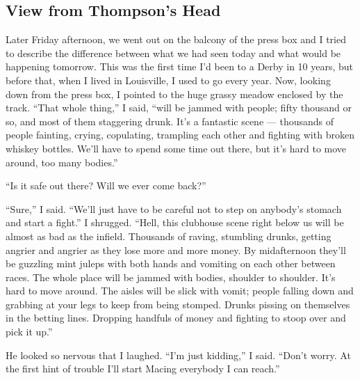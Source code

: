 \documentclass[9pt,a4paper]{extarticle}
\begin{document}

\subsection{View from Thompson’s Head}
Later Friday afternoon, we went out on the balcony of the press box and I tried to describe the difference between what we had seen today and what would be happening tomorrow. This was the first time I’d been to a Derby in 10 years, but before that, when I lived in Louisville, I used to go every year. Now, looking down from the press box, I pointed to the huge grassy meadow enclosed by the track. “That whole thing,” I said, “will be jammed with people; fifty thousand or so, and most of them staggering drunk. It’s a fantastic scene — thousands of people fainting, crying, copulating, trampling each other and fighting with broken whiskey bottles. We’ll have to spend some time out there, but it’s hard to move around, too many bodies.”

“Is it safe out there? Will we ever come back?”

“Sure,” I said. “We’ll just have to be careful not to step on anybody’s stomach and start a fight.” I shrugged. “Hell, this clubhouse scene right below us will be almost as bad as the infield. Thousands of raving, stumbling drunks, getting angrier and angrier as they lose more and more money. By midafternoon they’ll be guzzling mint juleps with both hands and vomiting on each other between races. The whole place will be jammed with bodies, shoulder to shoulder. It’s hard to move around. The aisles will be slick with vomit; people falling down and grabbing at your legs to keep from being stomped. Drunks pissing on themselves in the betting lines. Dropping handfuls of money and fighting to stoop over and pick it up.”

He looked so nervous that I laughed. “I’m just kidding,” I said. “Don’t worry. At the first hint of trouble I’ll start Macing everybody I can reach.”
\end{document}
